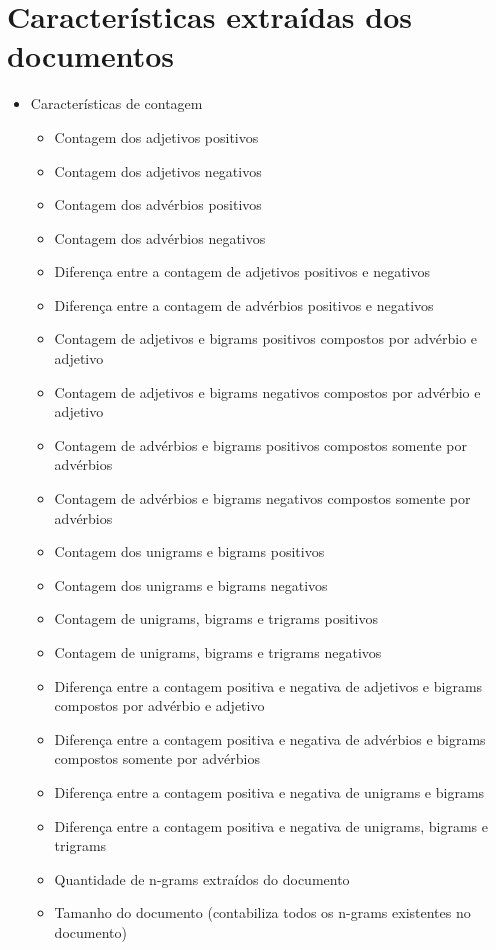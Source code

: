 \section{Características extraídas dos documentos} \label{sec:appendix1}

\begin{itemize}
\item Características de contagem %
\begin{itemize}
\item Contagem dos adjetivos positivos
\item Contagem dos adjetivos negativos
\item Contagem dos advérbios positivos
\item Contagem dos advérbios negativos
\item Diferença entre a contagem de adjetivos positivos e negativos
\item Diferença entre a contagem de advérbios positivos e negativos
\item Contagem de adjetivos e bigrams positivos compostos por advérbio e adjetivo
\item Contagem de adjetivos e bigrams negativos compostos por advérbio e adjetivo
\item Contagem de advérbios e bigrams positivos compostos somente por advérbios
\item Contagem de advérbios e bigrams negativos compostos somente por advérbios
\item Contagem dos unigrams e bigrams positivos
\item Contagem dos unigrams e bigrams negativos
\item Contagem de unigrams, bigrams e trigrams positivos 
\item Contagem de unigrams, bigrams e trigrams negativos
\item Diferença entre a contagem positiva e negativa de adjetivos e bigrams compostos por advérbio e adjetivo
\item Diferença entre a contagem positiva e negativa de advérbios e bigrams compostos somente por advérbios
\item Diferença entre a contagem positiva e negativa de unigrams e bigrams
\item Diferença entre a contagem positiva e negativa de unigrams, bigrams e trigrams
\item Quantidade de n-grams extraídos do documento
\item Tamanho do documento (contabiliza todos os n-grams existentes no documento)
\end{itemize}


\end{itemize}
